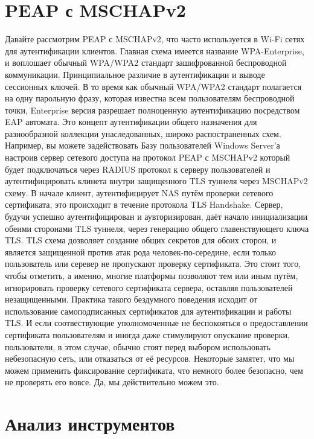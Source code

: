 \documentclass[oneside, final, 14pt]{extarticle}
\begin{document}
\cleardoublepage

\section{PEAP с MSCHAPv2}

Давайте рассмотрим PEAP с MSCHAPv2, что часто используется
в Wi-Fi сетях для аутентификации клиентов.
Главная схема имеется название WPA-Enterprise,
и воплошает обычный WPA/WPA2 стандарт зашифрованной беспроводной коммуникации.
Принципиальное различие в аутентификации и выводе сессионных ключей.
В то время как обычный WPA/WPA2 стандарт полагается на одну парольную фразу,
которая известна всем пользователям беспроводной точки,
Enterprise версия разрешает полноценную аутентификацию посредством
EAP автомата.
Это концепт аутентификации общего назначения для разнообразной коллекции
унаследованных, широко распостраненных схем.
Например, вы можете задействовать Базу пользователей Windows Server'а
настроив сервер сетевого доступа на протокол PEAP с MSCHAPv2
который будет подключаться через RADIUS протокол к серверу пользователей
и аутентифицировать
клинета внутри защищенного TLS туннеля через MSCHAPv2 схему.
В начале клиент, аутентифицирует NAS путём проверки сетевого сертификата,
это происходит в течение протокола TLS Handshake.
Сервер, будучи успешно аутентифицирован и аувторизирован, даёт начало
инициализации обеими сторонами TLS туннеля,
через генерацию общего главенствующего ключа TLS.
TLS схема дозволяет создание общих секретов для обоих сторон,
и является защищенной против атак рода человек-по-середине,
если только пользователь или серевер не пропускают проверку сертификата.
Это стоит того, чтобы отметить, а именно, многие платформы
позволяют тем или иным путём, игнорировать проверку сетевого сертификата сервера,
оставляя пользователей незащищенными.
Практика такого бездумного поведения исходит от использование
самоподписанных сертификатов для аутентификации и работы TLS.
И если соотвествующие уполномоченные не беспокояться о предоставлении
сертификата пользователям
и иногда даже стимулируют опускание проверки,
пользователи, в этом случае, обычно стоят перед выбором
использовать небезопасную сеть,
или отказаться от её ресурсов.
Некоторые замятет, что мы можем применить фиксирование сертификата,
что немного более безопасно, чем не проверять его вовсе.
Да, мы действительно можем это.

\cleardoublepage

\section{Анализ инструментов}
\end{document}
